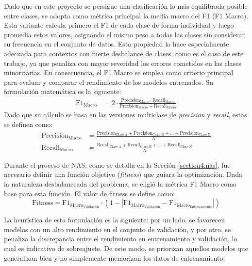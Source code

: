 Dado que en este proyecto se persigue una clasificación lo más equilibrada posible entre clases, se adopta como métrica principal la media macro del F1 (F1 Macro). Esta variante calcula primero el F1 de cada clase de forma individual y luego promedia estos valores, asignando el mismo peso a todas las clases sin considerar su frecuencia en el conjunto de datos. Esta propiedad la hace especialmente adecuada para contextos con fuerte desbalance de clases, como es el caso de este trabajo, ya que penaliza con mayor severidad los errores cometidos en las clases minoritarias. En consecuencia, el F1 Macro se emplea como criterio principal para evaluar y comparar el rendimiento de los modelos entrenados. Su formulación matemática es la siguiente:
\begin{align}
    \text{F1}_{\text{Macro}} &=  2 \cdot \frac{\text{Precision}_{\text{Macro}} \cdot \text{Recall}_{\text{Macro}}}{\text{Precision}_{\text{Macro}} + \text{Recall}_{\text{Macro}}} 
\end{align}
Dado que su cálculo se basa en las versiones multiclase de \textit{precision} y \textit{recall}, estas se definen como:
\begin{align}
    \text{Precision}_{\text{Macro}} &= \frac{\text{Precision}_{\text{Clase A}}+\text{Precision}_{\text{Clase B}}+\dots+\text{Precision}_{\text{Clase N}}}{N} \\
    \text{Recall}_{\text{Macro}} &= \frac{\text{Recall}_{\text{Clase A}}+\text{Recall}_{\text{Clase B}}+\dots+\text{Recall}_{\text{Clase N}}}{N}
\end{align}

Durante el proceso de NAS, como se detalla en la Sección \ref{section4:nas}, fue necesario definir una función objetivo (\textit{fitness}) que guiara la optimización. Dada la naturaleza desbalanceada del problema, se eligió la métrica F1 Macro como base para esta función. El valor de fitness se define como:
\begin{equation}
    \text{Fitness} = \text{F1}_{\text{Macro}_{\text{Validación}}} \cdot (1 - | \text{F1}_{\text{Macro}_{\text{Validación}}} -  \text{F1}_{\text{Macro}_{\text{Entrenamiento}}}|)
\end{equation}

La heurística de esta formulación es la siguiente: por un lado, se favorecen modelos con un alto rendimiento en el conjunto de validación, y por otro, se penaliza la discrepancia entre el rendimiento en entrenamiento y validación, lo cual es indicativo de sobreajuste. De este modo, se priorizan aquellos modelos que generalizan bien y no simplemente memorizan los datos de entrenamiento.

